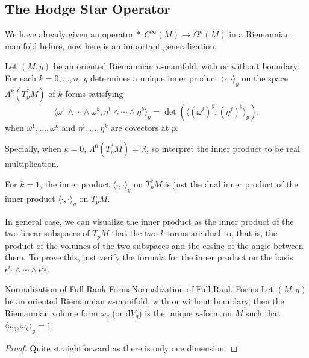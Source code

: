 \documentclass[../main.tex]{subfiles}
\begin{document}
\subsection{The Hodge Star Operator}
We have already given an operator $*: C^\infty (M) \rightarrow \Omega^n(M)$ in a Riemannian manifold before, now here is an important generalization.

Let $(M,g)$ be an oriented Riemannian $n$-manifold, with or without boundary. For each $k = 0, \ldots , n$, $g$ determines a unique inner product $\langle \cdot , \cdot \rangle_g$ on the space $\Lambda^k (T_p^*M)$ of $k$-forms satisfying
\begin{equation*}
  \langle \omega^1 \wedge \cdots \wedge \omega^k, \eta^1 \wedge \cdots \wedge \eta^k \rangle_g = \det (\langle (\omega^i)^\sharp, (\eta^j)^\sharp \rangle_g).
\end{equation*}
when $\omega^1, \ldots , \omega^k$ and $\eta^1, \ldots , \eta^k$ are covectors at $p$.

Specially, when $k=0$, $\Lambda^0 (T_p^*M) = \mathbb{R}$, so interpret the inner product to be real multiplication.

\begin{remark}
  For $k=1$, the inner product $\langle \cdot , \cdot \rangle_g$ on $T_p^*M$ is just the dual inner product of the inner product $\langle \cdot , \cdot \rangle_g$ on $T_p M$.

  In general case, we can visualize the inner product as the inner product of the two linear subspaces of $T_p M$ that the two $k$-forms are dual to, that is, the product of the volumes of the two subspaces and the cosine of the angle between them. To prove this, just verify the formula for the inner product on the basis $\epsilon^{i_1} \wedge \cdots \wedge \epsilon^{i_k}$. 
\end{remark}

\begin{proposition}{Normalization of Full Rank Forms}{Normalization of Full Rank Forms}
  Let $(M,g)$ be an oriented Riemannian $n$-manifold, with or without boundary, then the Riemannian volume form $\omega_g$ (or $\mathrm{d} V_g$) is the unique $n$-form on $M$ such that $\langle \omega_g, \omega_g \rangle_g = 1$.
\end{proposition}
\begin{proof}
  Quite straightforward as there is only one dimension.
\end{proof}
\end{document}
